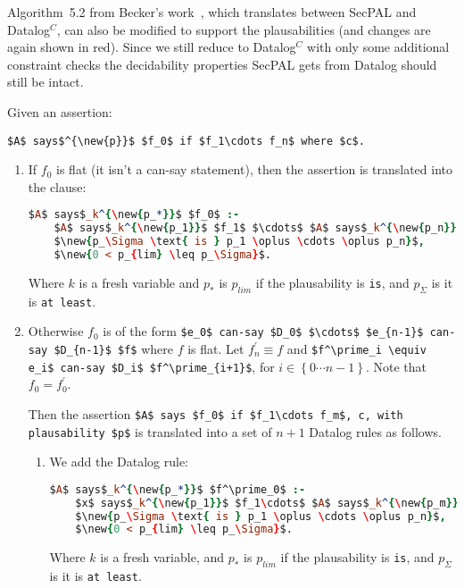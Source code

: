 \documentclass[a4paper]{scrartcl}
\newcommand{\new}[1]{{\color{BrickRed}#1}}
\begin{document}
Algorithm~5.2 from Becker's work~\cite{becker_secpal:_2010}, which translates
between SecPAL and Datalog$^C$, can also be modified to support the
plausabilities (and changes are again shown in red).  Since we still reduce to
Datalog$^C$ with only some additional constraint checks the decidability
properties SecPAL gets from Datalog should still be intact.

Given an assertion: 
\begin{center} \lstinline!$A$ says$^{\new{p}}$ $f_0$ if $f_1\cdots f_n$ where $c$.! \end{center}

\begin{enumerate}
\item 
  If $f_0$ is flat (it isn't a can-say statement), then the assertion is translated into the clause:
  \begin{lstlisting}[language=Prolog]
$A$ says$_k^{\new{p_*}}$ $f_0$ :- 
    $A$ says$_k^{\new{p_1}}$ $f_1$ $\cdots$ $A$ says$_k^{\new{p_n}}$ $f_n$, c, 
    $\new{p_\Sigma \text{ is } p_1 \oplus \cdots \oplus p_n}$, 
    $\new{0 < p_{lim} \leq p_\Sigma}$.
  \end{lstlisting}
  Where $k$ is a fresh variable \new{and $p_*$ is $p_{lim}$ if the plausability is \texttt{is}, and $p_\Sigma$ is it is \texttt{at least}}.
  
\item 
  Otherwise $f_0$ is of the form \lstinline!$e_0$ can-say $D_0$ $\cdots$ $e_{n-1}$ can-say $D_{n-1}$ $f$! where $f$ is flat.
  Let $f^\prime_n \equiv f$ and \lstinline!$f^\prime_i \equiv e_i$ can-say $D_i$ $f^\prime_{i+1}$!, for $i\in\left\{0\cdots n-1\right\}$.
  Note that $f_0 = f^\prime_0$.  

  Then the assertion \lstinline!$A$ says $f_0$ if $f_1\cdots f_m$, c, with plausability $p$! is translated into a set of $n+1$ Datalog rules as follows.
  
  \begin{enumerate}
  \item 
    We add the Datalog rule:
    \begin{lstlisting}[language=Prolog]
$A$ says$_k^{\new{p_*}}$ $f^\prime_0$ :-
    $x$ says$_k^{\new{p_1}}$ $f_1\cdots$ $A$ says$_k^{\new{p_m}}$ $f_m$, c,
    $\new{p_\Sigma \text{ is } p_1 \oplus \cdots \oplus p_n}$, 
    $\new{0 < p_{lim} \leq p_\Sigma}$.
    \end{lstlisting}
    Where $k$ is a fresh variable, \new{and $p_*$ is $p_{lim}$ if the plausability is \texttt{is}, and $p_\Sigma$ is it is \texttt{at least}}.


\end{enumerate}
\end{enumerate}
\end{document}
